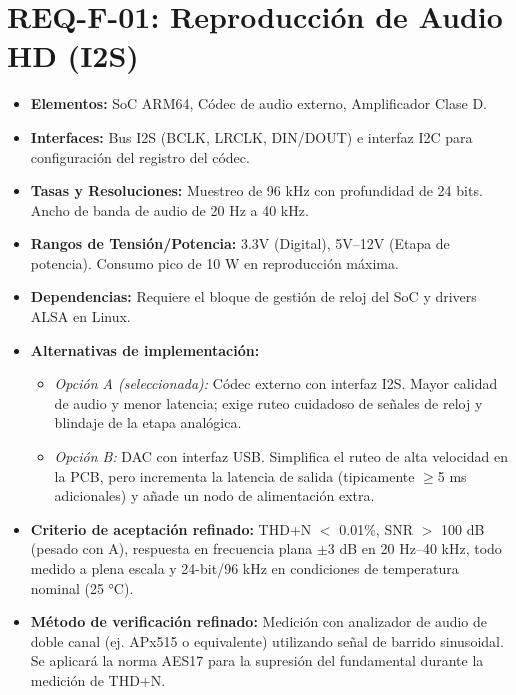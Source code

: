 \documentclass[%
	paper=a4,
	twoside=false,
	parskip=half,
	chapterprefix=false,
	10pt,
	headings=normal,
	bibliography=totoc,
	listof=totoc,
	titlepage=on,
	captions=tableabove,
	draft=false, 
]{scrbook}%
\begin{document}
\section{REQ-F-01: Reproducción de Audio HD (I2S)}
\begin{itemize}
    \item \textbf{Elementos:} SoC ARM64, Códec de audio externo, Amplificador Clase D.
    \item \textbf{Interfaces:} Bus I2S (BCLK, LRCLK, DIN/DOUT) e interfaz I2C para configuración del registro del códec.
    \item \textbf{Tasas y Resoluciones:} Muestreo de 96 kHz con profundidad de 24 bits. Ancho de banda de audio de 20 Hz a 40 kHz.
    \item \textbf{Rangos de Tensión/Potencia:} 3.3V (Digital), 5V–12V (Etapa de potencia). Consumo pico de 10 W en reproducción máxima.
    \item \textbf{Dependencias:} Requiere el bloque de gestión de reloj del SoC y drivers ALSA en Linux.
    \item \textbf{Alternativas de implementación:}
        \begin{itemize}
            \item \textit{Opción A (seleccionada):} Códec externo con interfaz I2S. Mayor calidad de audio y menor latencia; exige ruteo cuidadoso de señales de reloj y blindaje de la etapa analógica.
            \item \textit{Opción B:} DAC con interfaz USB. Simplifica el ruteo de alta velocidad en la PCB, pero incrementa la latencia de salida (tipicamente $\geq$5 ms adicionales) y añade un nodo de alimentación extra.
        \end{itemize}
    \item \textbf{Criterio de aceptación refinado:} THD+N $<$ 0.01\%, SNR $>$ 100 dB (pesado con A), respuesta en frecuencia plana $\pm$3 dB en 20 Hz–40 kHz, todo medido a plena escala y 24-bit/96 kHz en condiciones de temperatura nominal (25 °C).
    \item \textbf{Método de verificación refinado:} Medición con analizador de audio de doble canal (ej. APx515 o equivalente) utilizando señal de barrido sinusoidal. Se aplicará la norma AES17 para la supresión del fundamental durante la medición de THD+N.
\end{itemize}

\end{document}
